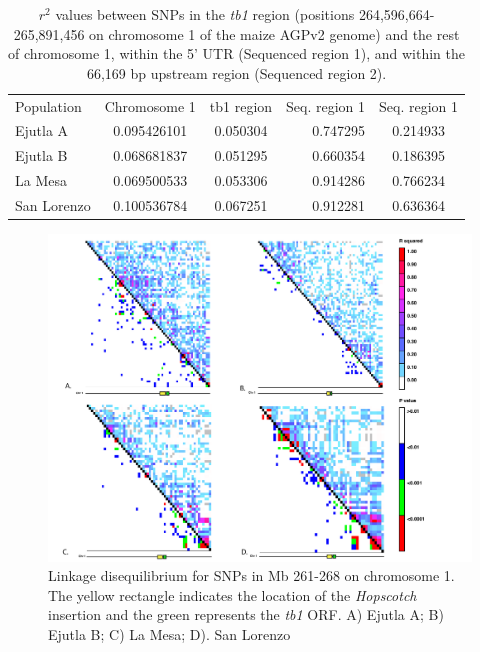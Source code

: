 \documentclass[11pt]{article}
\begin{document}
\begin{linenumbers}
\begin{flushleft}
\begin{table}[htbp]
  \centering
  \caption{$r^{2}$ values between SNPs in the \emph{tb1} region (positions 264,596,664-265,891,456 on chromosome 1 of the maize AGPv2 genome) and the rest of chromosome 1, within the 5' UTR (Sequenced region 1), and within the 66,169 bp upstream region (Sequenced region 2).}
    \begin{tabular}{lccrc}
    \multirow{2}[2]{*}{Population} & \multirow{2}[2]{*}{Chromosome 1} & \multirow{2}[2]{*}{tb1 region} & \multicolumn{1}{c}{\multirow{2}[2]{*}{Seq. region 1}} & \multirow{2}[2]{*}{Seq. region 1 } \\
          &       &       & \multicolumn{1}{c}{} &  \\
    Ejutla A & 0.095426101 & 0.050304 & 0.747295 & 0.214933 \\
    Ejutla B & 0.068681837 & 0.051295 & 0.660354 & 0.186395 \\
    La Mesa & 0.069500533 & 0.053306 & 0.914286 & 0.766234 \\
    San Lorenzo & 0.100536784 & 0.067251 & 0.912281 & 0.636364 \\
    \bottomrule
    \end{tabular}
  \label{Table3R2}
\end{table}

\begin{figure}[!t]
  \begin{center}
   \includegraphics[width=150mm]{Fig2LDPlots.pdf}
    \caption{Linkage disequilibrium for SNPs in Mb 261-268 on chromosome 1. The yellow rectangle indicates the location of the \emph{Hopscotch} insertion and the green represents the \emph{tb1} ORF. A) Ejutla A; B) Ejutla B; C) La Mesa; D). San Lorenzo} 
\label{Fig2LD}
  \end{center}
\end{figure}


\end{flushleft}
\end{linenumbers}
\end{document}
